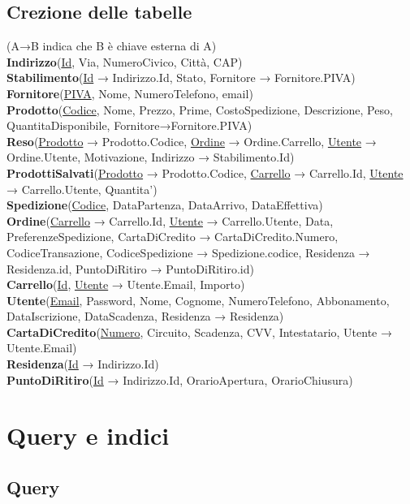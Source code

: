 \documentclass[10pt]{article}
\begin{document}
\subsection{Crezione delle tabelle} 

(A→B indica che B è chiave esterna di A)\\
\textbf{Indirizzo}(\underline{Id}, Via, NumeroCivico, Città, CAP)\\
\textbf{Stabilimento}(\underline{Id} → Indirizzo.Id, Stato, Fornitore → Fornitore.PIVA)\\
\textbf{Fornitore}(\underline{PIVA}, Nome, NumeroTelefono, email)\\
\textbf{Prodotto}(\underline{Codice}, Nome, Prezzo, Prime, CostoSpedizione, Descrizione, Peso, QuantitaDisponibile, Fornitore→Fornitore.PIVA)\\
\textbf{Reso}(\underline{Prodotto} → Prodotto.Codice, \underline{Ordine} → Ordine.Carrello, \underline{Utente} → Ordine.Utente, Motivazione, Indirizzo → Stabilimento.Id)\\
\textbf{ProdottiSalvati}(\underline{Prodotto} → Prodotto.Codice, \underline{Carrello} → Carrello.Id, \underline{Utente} → Carrello.Utente, Quantita')\\
\textbf{Spedizione}(\underline{Codice}, DataPartenza, DataArrivo, DataEffettiva)\\
\textbf{Ordine}(\underline{Carrello} → Carrello.Id, \underline{Utente} → Carrello.Utente, Data, PreferenzeSpedizione, CartaDiCredito → CartaDiCredito.Numero, CodiceTransazione, CodiceSpedizione → Spedizione.codice, Residenza → Residenza.id, PuntoDiRitiro → PuntoDiRitiro.id)\\
\textbf{Carrello}(\underline{Id}, \underline{Utente} → Utente.Email, Importo)\\
\textbf{Utente}(\underline{Email}, Password, Nome, Cognome, NumeroTelefono, Abbonamento, DataIscrizione, DataScadenza, Residenza → Residenza)\\
\textbf{CartaDiCredito}(\underline{Numero}, Circuito, Scadenza, CVV, Intestatario, Utente → Utente.Email)\\
\textbf{Residenza}(\underline{Id} → Indirizzo.Id)\\
\textbf{PuntoDiRitiro}(\underline{Id} → Indirizzo.Id, OrarioApertura, OrarioChiusura)

\section{Query e indici}

\subsection{Query}
\end{document}
